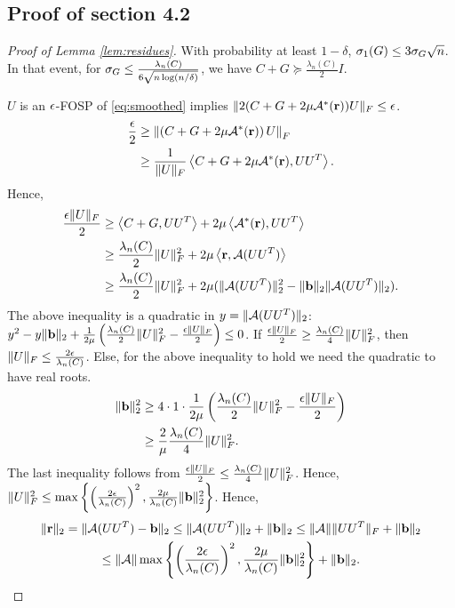 \subsection{Proof of section 4.2}
\begin{proof}[Proof of Lemma \ref{lem:residues}]
With probability at least $1-\delta$, $\sigma_1(G) \leq 3\sigma_G\sqrt{n} $. In that event, for $\sigma_G \leq \frac{\lambda_{n}(C)}{6\sqrt{n \log(n/\delta)}}$, we have $C+G \succeq \frac{\lambda_{n}(C)}{2}I$.

$U$ is an $\epsilon$-FOSP of \eqref{eq:smoothed} implies $\|2(C+G+2\mu \mathcal{A}^*(\mathbf{r}))U\|_F \leq \epsilon$. \begin{align*}
\frac{\epsilon}{2} &\geq \left\| \left(C+G+2\mu \mathcal{A}^*(\mathbf{r}) \right)U \right\|_F \\
&\geq \frac{1}{\|U\|_F}  \left\langle C+G+2\mu \mathcal{A}^*(\mathbf{r}), UU^T \right\rangle .
\end{align*} Hence, \begin{align*} 
\frac{\epsilon \|U\|_F}{2}  &\geq \left\langle C+G, UU^T \right\rangle + 2\mu\left\langle  \mathcal{A}^*(\mathbf{r}), UU^T \right\rangle  \\
&\geq  \frac{\lambda_n(C)}{2}\|U\|_F^2+2\mu\left\langle \mathbf{r}, \mathcal{A}(UU^T) \right\rangle \\
&\geq \frac{\lambda_n(C)}{2}\|U\|_F^2+2\mu( \|\mathcal{A}(UU^T)\|_2^2 - \|\mathbf{b}\|_2\|\mathcal{A}(UU^T)\|_2).
 \end{align*}
The above inequality is  a quadratic in $y=\|\mathcal{A}(UU^T)\|_2$: $y^2 -y \|\mathbf{b}\|_2 + \frac{1}{2\mu} \left(\frac{\lambda_n(C)}{2}\|U\|_F^2 -\frac{\epsilon \|U\|_F}{2}\right) \leq 0$. If $\frac{\epsilon \|U\|_F}{2} \geq \frac{\lambda_n(C)}{4}\|U\|_F^2$, then  $\|U\| _F \leq \frac{2\epsilon} {\lambda_n(C)}$. Else, for the above inequality to hold we need the quadratic to have real roots.
\begin{align*}
\|\mathbf{b}\|_2^2 &\geq 4 \cdot 1 \cdot \frac{1}{2\mu} \left( \frac{\lambda_n(C)}{2}\|U\|_F^2 -\frac{\epsilon \|U\|_F}{2} \right) \\
&\geq \frac{2}{\mu} \frac{\lambda_n(C)}{4}\|U\|_F^2.
\end{align*}
The last inequality follows from  $\frac{\epsilon \|U\|_F}{2} \leq \frac{\lambda_n(C)}{4}\|U\|_F^2$. Hence, $\|U\|_F^2 \leq \max \left \{ \left( \frac{2\epsilon} {\lambda_n(C)}\right)^2, \frac{2\mu}{\lambda_n(C)} \|\mathbf{b}\|_2^2 \right \}$. Hence,
\begin{multline*}
\|\mathbf{r}\|_2 = \| \mathcal{A}(UU^T) -\mathbf{b}\|_2 \leq \|\mathcal{A}(UU^T)\|_2 +\|\mathbf{b}\|_2 \leq \|\mathcal{A}\| \|UU^T\|_F +\|\mathbf{b}\|_2 \\ \leq \|\mathcal{A}\| \max \left \{ \left( \frac{2\epsilon} {\lambda_n(C)}\right)^2, \frac{2\mu}{\lambda_n(C)} \|\mathbf{b}\|_2^2 \right \}+\|\mathbf{b}\|_2.
\end{multline*}
\end{proof}
